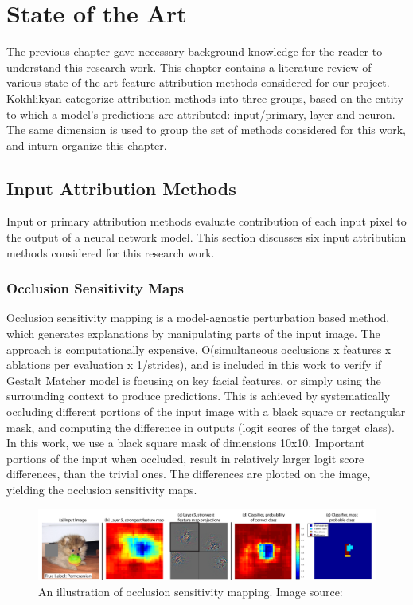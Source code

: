 \documentclass[../report.tex]{subfiles}
\begin{document}
    \chapter{State of the Art}\label{ch_sota}
	The previous chapter gave necessary background knowledge for the reader to understand this research work. This chapter contains a literature review of various state-of-the-art feature attribution methods considered for our project. Kokhlikyan \etal \cite{kokhlikyan2020captum} categorize attribution methods into three groups, based on the entity to which a model's predictions are attributed: input/primary, layer and neuron. The same dimension is used to group the set of methods considered for this work, and inturn organize this chapter.
 
    \section{Input Attribution Methods}
    Input or primary attribution methods evaluate contribution of each input pixel to the output of a neural network model. This section discusses six input attribution methods considered for this research work.
    \subsection{Occlusion Sensitivity Maps}
    Occlusion sensitivity mapping \cite{matthew2014visualizing} is a model-agnostic perturbation based method, which generates explanations by manipulating parts of the input image. The approach is computationally expensive, O(simultaneous occlusions x features x ablations per evaluation x 1/strides), and is included in this work to verify if Gestalt Matcher model is focusing on key facial features, or simply using the surrounding context to produce predictions. This is achieved by systematically occluding different portions of the input image with a black square or rectangular mask, and computing the difference in outputs (logit scores of the target class). In this work, we use a  black square mask of dimensions 10x10. Important portions of the input when occluded, result in relatively larger logit score differences, than the trivial ones. The differences are plotted on the image, yielding the occlusion sensitivity maps.
    
    \begin{figure}[H]
    	\includegraphics[width=\textwidth]{images/occlusion_sensitivity_map}
    	\caption{An illustration of occlusion sensitivity mapping. Image source: \cite{matthew2014visualizing}}
    	\label{osm}
    \end{figure}
    
\end{document}
